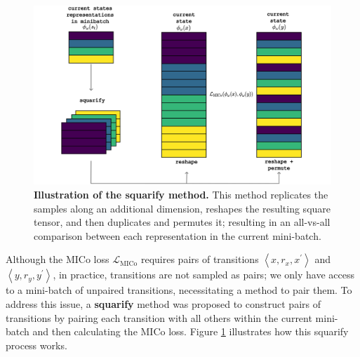 \begin{figure}[H]
    \centering
    \includegraphics[width=1\linewidth]{Figures/squarify.jpg}
    \caption[Illustration of the squarify method]{\textbf{Illustration of the squarify method.} This method replicates the samples along an additional dimension, reshapes the resulting square tensor, and then duplicates and permutes it; resulting in an all-vs-all comparison between each representation in the current mini-batch.}
    \label{fig:squarify}
\end{figure}


Although the MICo loss $\mathcal{L}_{\text{MICo}}$ requires pairs of transitions $\left\langle x, r_x, x^{\prime}\right\rangle$ and $\left\langle y, r_y, y^{\prime}\right\rangle$, in practice, transitions are not sampled as pairs; we only have access to a mini-batch of unpaired transitions, necessitating a method to pair them. To address this issue, a \textbf{squarify} method \cite{castro2020scalable} was proposed to construct pairs of transitions by pairing each transition with all others within the current mini-batch and then calculating the MICo loss. Figure \ref{fig:squarify} illustrates how this squarify process works.




